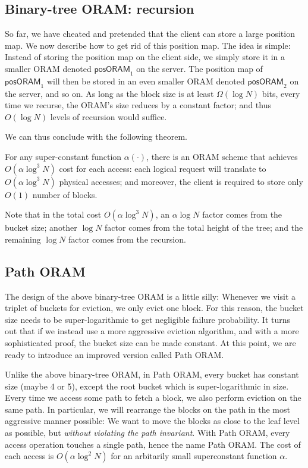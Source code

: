 \subsection{Binary-tree ORAM: recursion}\label{binary-tree-oram-recursion}

So far, we have cheated and pretended that the client can store a large
position map. We now describe how to get rid of this position map. The
idea is simple: Instead of storing the position map on the client side,
we simply store it in a smaller ORAM denoted
\(\textsf{posORAM}_{1}\) on the server. The position map of
\(\textsf{posORAM}_{1}\) will then be stored in an even smaller
ORAM denoted \(\textsf{posORAM}_{2}\) on the server, and so on.
As long as the block size is at least \(\Omega( \log N )\)
bits, every time we recurse, the ORAM's size reduces by a constant
factor; and thus \(O( \log N )\) levels of recursion would
suffice.

We can thus conclude with the following theorem.

\begin{theorem}
For any
super-constant function \(\alpha( \cdot )\), there is an ORAM scheme
that achieves \(O( \alpha\log^{3}N )\) cost for each access:
each logical request will translate to
\(O( \alpha\log^{3}N )\) physical accesses; and moreover, the
client is required to store only \(O(1)\) number of blocks.
\end{theorem}

Note that in the total cost \(O( \alpha\log^{3}N )\), an
\(\alpha\log N\) factor comes from the bucket size; another \(\log N\)
factor comes from the total height of the tree; and the remaining
\(\log N\) factor comes from the recursion.

\subsection{Path ORAM}\label{path-oram}

The design of the above binary-tree ORAM is a little silly: Whenever we
visit a triplet of buckets for eviction, we only evict one block. For
this reason, the bucket size needs to be super-logarithmic to get
negligible failure probability. It turns out that if we instead use a
more aggressive eviction algorithm, and with a more sophisticated proof,
the bucket size can be made constant. At this point, we are ready to
introduce an improved version called Path ORAM.

Unlike the above binary-tree ORAM, in Path ORAM, every bucket has
constant size (maybe 4 or 5), except the root bucket which is
super-logarithmic in size. Every time we access some path to fetch a
block, we also perform eviction on the same path. In particular, we will
rearrange the blocks on the path in the most aggressive manner possible:
We want to move the blocks as close to the leaf level as possible, but
\emph{without violating the path invariant}. With Path ORAM, every
access operation touches a single path, hence the name Path ORAM. The
cost of each access is \(O( \alpha\log^{2}N )\) for an
arbitarily small superconstant function \(\alpha\).


